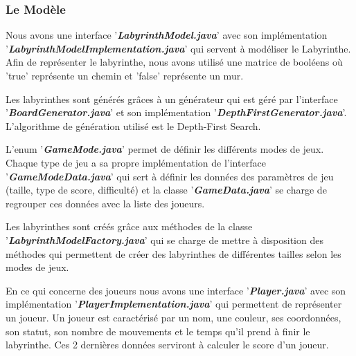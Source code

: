 \subsubsection{Le Modèle}
\label{subsubsec:modele}

Nous avons une interface '\textbf{\textit{LabyrinthModel.java}}' avec son implémentation
'\textbf{\textit{LabyrinthModelImplementation.java}}' qui servent à modéliser le Labyrinthe.
Afin de représenter le labyrinthe, nous avons utilisé une matrice de booléens
où 'true' représente un chemin et 'false' représente un mur.

Les labyrinthes sont générés grâces à un générateur qui est géré par
l'interface '\textbf{\textit{BoardGenerator.java}}' et son implémentation '\textbf{\textit{DepthFirstGenerator.java}}'.
L'algorithme de génération utilisé est le Depth-First Search.

L'enum '\textbf{\textit{GameMode.java}}' permet de définir les différents modes de jeux.
Chaque type de jeu a sa propre implémentation de l'interface '\textbf{\textit{GameModeData.java}}'
qui sert à définir les données des paramètres de jeu
(taille, type de score, difficulté) et la classe '\textbf{\textit{GameData.java}}' se charge de
regrouper ces données avec la liste des joueurs.

Les labyrinthes sont créés grâce aux méthodes de la classe
'\textbf{\textit{LabyrinthModelFactory.java}}' qui se charge de mettre à disposition des méthodes
qui permettent de créer des labyrinthes de différentes tailles selon les modes
de jeux.

En ce qui concerne des joueurs nous avons une interface '\textbf{\textit{Player.java}}' avec son
implémentation '\textbf{\textit{PlayerImplementation.java}}' qui permettent de représenter un
joueur. Un joueur est caractérisé par un nom, une couleur, ses coordonnées, son
statut, son nombre de mouvements et le temps qu'il prend à finir le labyrinthe.
Ces 2 dernières données serviront à calculer le score d'un joueur.


